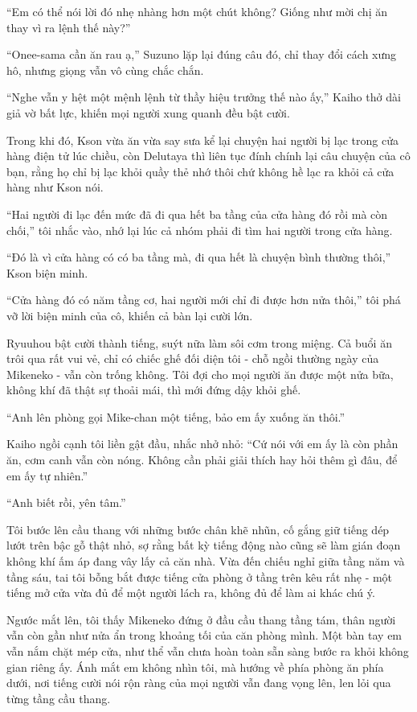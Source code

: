 ﻿\documentclass[../main.tex]{subfiles}
\begin{document}
``Em có thể nói lời đó nhẹ nhàng hơn một chút không? Giống như mời chị ăn thay vì ra lệnh thế này?''

``Onee-sama cần ăn rau ạ,'' Suzuno lặp lại đúng câu đó, chỉ thay đổi cách xưng hô, nhưng giọng vẫn vô cùng chắc chắn.

``Nghe vẫn y hệt một mệnh lệnh từ thầy hiệu trưởng thế nào ấy,'' Kaiho thở dài giả vờ bất lực, khiến mọi người xung quanh đều bật cười.

Trong khi đó, Kson vừa ăn vừa say sưa kể lại chuyện hai người bị lạc trong cửa hàng điện tử lúc chiều, còn Delutaya thì liên tục đính chính lại câu chuyện của cô bạn, rằng họ chỉ bị lạc khỏi quầy thẻ nhớ thôi chứ không hề lạc ra khỏi cả cửa hàng như Kson nói.

``Hai người đi lạc đến mức đã đi qua hết ba tầng của cửa hàng đó rồi mà còn chối,'' tôi nhắc vào, nhớ lại lúc cả nhóm phải đi tìm hai người trong cửa hàng.

``Đó là vì cửa hàng có có ba tầng mà, đi qua hết là chuyện bình thường thôi,'' Kson biện minh.

``Cửa hàng đó có năm tầng cơ, hai người mới chỉ đi được hơn nửa thôi,'' tôi phá vỡ lời biện minh của cô, khiến cả bàn lại cười lớn.

Ryuuhou bật cười thành tiếng, suýt nữa làm sôi cơm trong miệng. Cả buổi ăn trôi qua rất vui vẻ, chỉ có chiếc ghế đối diện tôi - chỗ ngồi thường ngày của Mikeneko - vẫn còn trống không. Tôi đợi cho mọi người ăn được một nửa bữa, không khí đã thật sự thoải mái, thì mới đứng dậy khỏi ghế.

``Anh lên phòng gọi Mike-chan một tiếng, bảo em ấy xuống ăn thôi.''

Kaiho ngồi cạnh tôi liền gật đầu, nhắc nhở nhỏ: ``Cứ nói với em ấy là còn phần ăn, cơm canh vẫn còn nóng. Không cần phải giải thích hay hỏi thêm gì đâu, để em ấy tự nhiên.''

``Anh biết rồi, yên tâm.''

\ct

Tôi bước lên cầu thang với những bước chân khẽ nhũn, cố gắng giữ tiếng dép lướt trên bậc gỗ thật nhỏ, sợ rằng bất kỳ tiếng động nào cũng sẽ làm gián đoạn không khí ấm áp đang vây lấy cả căn nhà. Vừa đến chiếu nghỉ giữa tầng năm và tầng sáu, tai tôi bỗng bắt được tiếng cửa phòng ở tầng trên kêu rất nhẹ - một tiếng mở cửa vừa đủ để một người lách ra, không đủ để làm ai khác chú ý.

Ngước mắt lên, tôi thấy Mikeneko đứng ở đầu cầu thang tầng tám, thân người vẫn còn gần như nửa ẩn trong khoảng tối của căn phòng mình. Một bàn tay em vẫn nắm chặt mép cửa, như thể vẫn chưa hoàn toàn sẵn sàng bước ra khỏi không gian riêng ấy. Ánh mắt em không nhìn tôi, mà hướng về phía phòng ăn phía dưới, nơi tiếng cười nói rộn ràng của mọi người vẫn đang vọng lên, len lỏi qua từng tầng cầu thang.
\end{document}
